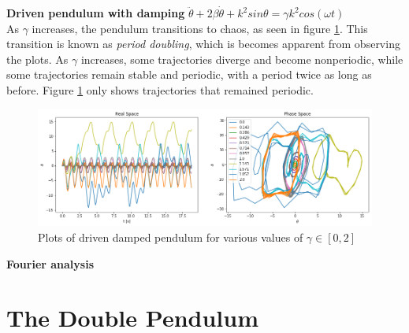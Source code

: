 \documentclass[12pt]{article}
\newenvironment{problem}[2][]{\begin{trivlist}
\item[\hskip \labelsep {\bfseries #1}\hskip \labelsep {\bfseries #2.}]}{\end{trivlist}}
\begin{document}
\begin{problem}{6}
	\textbf{Driven pendulum with damping} $\ddot{\theta}+2\beta\dot{\theta}+k^{2}sin\theta=\gamma k^{2}cos(\omega t)$ \\

As $\gamma$ increases, the pendulum transitions to chaos, as seen in figure \ref{damped}.  This transition is known as \textit{period doubling}, which is becomes apparent from observing the plots.  As $\gamma$ increases, some trajectories diverge and become nonperiodic, while some trajectories remain stable and periodic, with a period twice as long as before. Figure \ref{damped} only shows trajectories that remained periodic. 

\begin{figure}[h!]
	\centering
  	\includegraphics[scale=0.5]{../figures/dampedDriven.png}
 	\caption{Plots of driven damped pendulum for various values of $\gamma \in [0,2]$}
  	\label{damped}
\end{figure}

\end{problem}

\begin{problem}{7}
	\textbf{Fourier analysis}
\end{problem}

\section*{The Double Pendulum}
\end{document}
